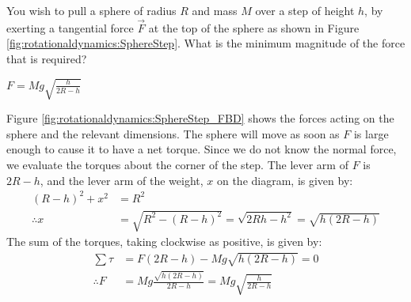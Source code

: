 \question You wish to pull a sphere of radius $R$ and mass $M$ over a step of height $h$, by exerting a tangential force $\vec F$ at the top of the sphere as shown in Figure \ref{fig:rotationaldynamics:SphereStep}. What is the minimum magnitude of the force that is required?
\begin{finalanswer}
$F=Mg\sqrt{\frac{h}{2R-h}}$
\end{finalanswer}
\begin{solution}
Figure \ref{fig:rotationaldynamics:SphereStep_FBD} shows the forces acting on the sphere and the relevant dimensions. The sphere will move as soon as $F$ is large enough to cause it to have a net torque. 
Since we do not know the normal force, we evaluate the torques about the corner of the step. The lever arm of $F$ is $2R-h$, and the lever arm of the weight, $x$ on the diagram, is given by:
\begin{align*}
(R-h)^2+x^2&=R^2\\
\therefore x&=\sqrt{R^2-(R-h)^2}=\sqrt{2Rh-h^2}=\sqrt{h(2R-h)}
\end{align*}
The sum of the torques, taking clockwise as positive, is given by:
\begin{align*}
\sum \tau &= F(2R-h)-Mg\sqrt{h(2R-h)}=0\\
\therefore F&=Mg\frac{\sqrt{h(2R-h)}}{2R-h}=Mg\sqrt{\frac{h}{2R-h}}
\end{align*}

\end{solution}

